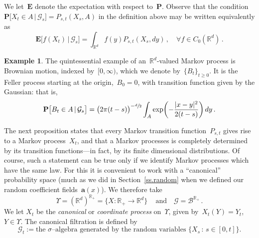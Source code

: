 \documentclass[11pt]{article} %
\numberwithin{equation}{section}
\theoremstyle{definition}
\newtheorem{example}[theorem]{Example}
\newcommand*{\R}{\ensuremath{\mathbb{R}}}
\newcommand*{\Rd}{\ensuremath{\mathbb{R}^d}}
\renewcommand{\a}{\mathbf{a}}
\begin{document}
We let~$\mathbf{E}$ denote the expectation with respect to~$\mathbf{P}$. Observe that the condition~$\mathbf{P} \bigl[ X_t \in A \, | \, \mathcal{G}_s \bigr] = P_{s,t}(X_s,A)$ in the definition above may be written equivalently as
\begin{equation}
\label{e.Xt.to.Pt}
\mathbf{E} \bigl[ f(X_t) \, |\, \mathcal{G}_s \bigr] 
=
\int_{\Rd} 
f(y) P_{s,t} (X_s,dy) \,, \quad \forall f \in C_0(\Rd)\,.
\end{equation}


\begin{example}
The quintessential example of an~$\Rd$-valued Markov process is Brownian motion, indexed by~$[0,\infty)$, which we denote by~$\{ B_t \}_{t\geq 0}$. It is the Feller process starting at the origin,~$B_0=0$, with transition function given by the Gaussian: that is, 
\begin{equation}
\label{e.transition.BM}
\mathbf{P}\bigl[ B_t \in A \, | \, \mathcal{G}_s \bigr]
=
\bigl( 2\pi (t-s) \bigr)^{-\sfrac d2}
\int_A 
\exp \biggl( - \frac{|x-y|^2}{2(t-s)} \biggr)\, dy
\,.
\end{equation}
\end{example}





The next proposition states that every Markov transition function~$P_{s,t}$ gives rise to a Markov process~$X_t$, and that a Markov processes is completely determined by its  transition functions---in fact, by its finite dimensional distributions. Of course, such a statement can be true only if we identify Markov processes which have the same law. 
For this it is convenient to work with a ``canonical'' probability space (much as we did in Section~\ref{ss.random} when we defined our random coefficient fields~$\a(x)$). 
We therefore take 
\begin{equation}
\label{e.Upsilon.canon}
\Upsilon = (\Rd)^{\R_+} = \bigl\{ X : \R_+ \to \Rd \bigr\}\,
\quad \mbox{and} \quad 
\mathcal{G} = \mathscr{B}^{\R_+}\,.
\end{equation}
We let $X_t$ be the \emph{canonical} or \emph{coordinate process} on~$\Upsilon$,  given by~$X_t(Y) = Y_t$, $Y \in \Upsilon$. The canonical filtration is defined by
\begin{equation}
\label{e.Gt.canon}
\mathcal{G}_t:= \mbox{the $\sigma$--algebra generated by the random variables $\big\{ X_s \,:\, s\in [0,t] \big\}$.}
\end{equation}
\end{document}
